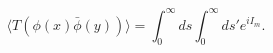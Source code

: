 \begin{equation}
\label{greenmink}
\langle T(\phi (x)\bar{\phi}(y))\rangle =\int_0^{\infty}ds\int_0^{\infty}ds'e^{iI_m}.
\end{equation}

